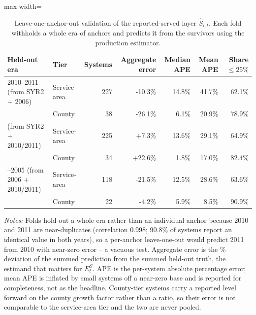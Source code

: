 \begin{table}[ht]
\centering
\caption{Leave-one-anchor-out validation of the reported-served layer $\hat S_{i,t}$. Each fold withholds a whole era of anchors and predicts it from the survivors using the production estimator.}
\label{tab:backcast_loao}
\begin{adjustbox}{max width=\textwidth}
\begin{tabular}{llrrrrr}
\toprule
Held-out era & Tier & Systems & Aggregate error & Median APE & Mean APE & Share $\le\!25\%$ \\
\midrule
2010--2011 (from SYR2 + 2006) & Service-area & 227 & -10.3\% & 14.8\% & 41.7\% & 62.1\% \\
 & County & 38 & -26.1\% & 6.1\% & 20.9\% & 78.9\% \\
\addlinespace
2006 (from SYR2 + 2010/2011) & Service-area & 225 & +7.3\% & 13.6\% & 29.1\% & 64.9\% \\
 & County & 34 & +22.6\% & 1.8\% & 17.0\% & 82.4\% \\
\addlinespace
1998--2005 (from 2006 + 2010/2011) & Service-area & 118 & -21.5\% & 12.5\% & 28.6\% & 63.6\% \\
 & County & 22 & -4.2\% & 5.9\% & 8.5\% & 90.9\% \\
\bottomrule
\end{tabular}
\end{adjustbox}
\begin{minipage}{\textwidth}\footnotesize
\vspace{0.5em}
\textit{Notes:} Folds hold out a whole era rather than an individual anchor because 2010 and 2011 are near-duplicates (correlation 0.998; 90.8\% of systems report an identical value in both years), so a per-anchor leave-one-out would predict 2011 from 2010 with near-zero error -- a vacuous test. Aggregate error is the \% deviation of the summed prediction from the summed held-out truth, the estimand that matters for $E^S_t$. APE is the per-system absolute percentage error; mean APE is inflated by small systems off a near-zero base and is reported for completeness, not as the headline. County-tier systems carry a reported level forward on the county growth factor rather than a ratio, so their error is not comparable to the service-area tier and the two are never pooled.
\end{minipage}
\end{table}

